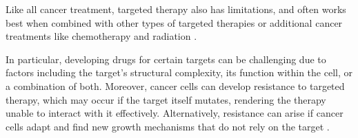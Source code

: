Like all cancer treatment, targeted therapy also has limitations, and often works best when combined with other types of targeted therapies or additional cancer treatments like chemotherapy and radiation \cite{target_therapy1}.

In particular, developing drugs for certain targets can be challenging due to factors including the target's structural complexity, its function within the cell, or a combination of both. Moreover, cancer cells can develop resistance to targeted therapy, which may occur if the target itself mutates, rendering the therapy unable to interact with it effectively. Alternatively, resistance can arise if cancer cells adapt and find new growth mechanisms that do not rely on the target \cite{target_therapy1}. 

